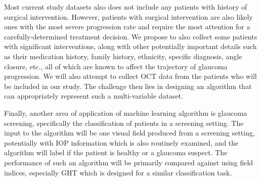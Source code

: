 Most current study datasets also does not include any patients with history of surgical intervention. However, patients with surgical intervention are also likely ones with the most severe progression rate and require the most attention for a carefully-determined treatment decision. We propose to also collect some patients with significant interventions, along with other potentially important details such as their medication history, family history, ethnicity, specific diagnosis, angle closure, etc., all of which are known to affect the trajectory of glaucoma progression. We will also attempt to collect \ac{OCT} data from the patients who will be included in our study. The challenge then lies in designing an algorithm that can appropriately represent such a multi-variable dataset. 

Finally, another area of application of machine learning algorithm is glaucoma screening, specifically the classification of patients in a screening setting. The input to the algorithm will be one visual field produced from a screening setting, potentially with \ac{IOP} information which is also routinely examined, and the algorithm will label if the patient is healthy or a glaucoma suspect. The performance of such an algorithm will be primarily compared against using field indices, especially \ac{GHT} which is designed for a similar classification task. 

